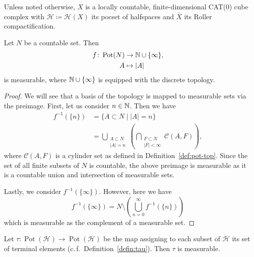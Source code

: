 Unless noted otherwise, \(X\) is a locally countable, finite-dimensional CAT(0) cube complex with \(\mathcal{H} \coloneqq \mathcal{H}(X)\) its pocset of halfspaces and \(\bar X\) its Roller compactification.

\begin{lemma}
  \label{lem:measurable-countable}
  Let \(N\) be a countable set. Then
  \begin{align*}
    f\colon \operatorname{Pot}(N) &\to \mathbb{N} \cup \{\infty\},\\
    A &\mapsto |A|
  \end{align*}
  is measurable, where \(\mathbb{N} \cup \{\infty\}\) is equipped with the discrete topology.
\end{lemma}

\begin{proof}
  We will see that a basis of the topology is mapped to measurable sets via the preimage. First, let us consider \(n \in \mathbb{N}\). Then we have
  \begin{align*}
    f^{-1}(\{n\})
    & = \{ A \subset N \mid |A| = n\}\\
    & = \bigcup_{\substack{A \subset N\\|A| = n}} \left ( \bigcap_{\substack{F \subset N\\|F|< \infty}}\mathcal{C}(A,F)\right),
  \end{align*}
  where \(\mathcal{C}(A,F)\) is a cylinder set as defined in Definition~\ref{def:pot-top}. Since the set of all finite subsets of \(N\) is countable, the above preimage is measurable as it is a countable union and intersection of measurable sets.

  Lastly, we consider \(f^{-1}(\{\infty\})\). However, here we have
  \[
    f^{-1}(\{\infty\}) = N \setminus \left (\bigcup_{n=0}^\infty f^{-1}(\{n\})\right)
  \]
  which is measurable as the complement of a measurable set.
\end{proof}

\begin{lemma}
  \label{lem:tau}
   Let \(\tau\colon \operatorname{Pot}(\mathcal{H}) \to \operatorname{Pot}(\mathcal{H})\) be the map assigning to each subset of \(\mathcal{H}\) its set of terminal elements (c.\,f.~Definition~\ref{defin:tau}). Then \(\tau\) is measurable.
\end{lemma}

